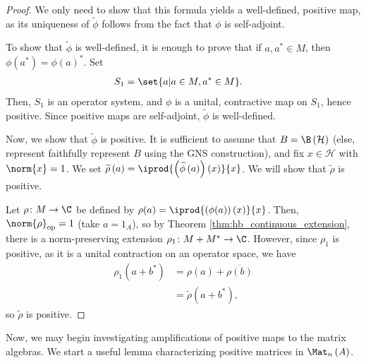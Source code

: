 \begin{proof}
  We only need to show that this formula yields a well-defined, positive map, as its uniqueness of $\widetilde{\phi}$ follows from the fact that $\phi$ is self-adjoint.\newline

  To show that $\widetilde{\phi}$ is well-defined, it is enough to prove that if $a,a^{\ast}\in M$, then $\phi\left( a^{\ast} \right) = \phi\left( a \right)^{\ast}$. Set
  \begin{align*}
    S_1 &= \set{a | a\in M,a^{\ast}\in M}.
  \end{align*}
  Then, $S_1$ is an operator system, and $\phi$ is a unital, contractive map on $S_1$, hence positive. Since positive maps are self-adjoint, $\widetilde{\phi}$ is well-defined.\newline

  Now, we show that $\widetilde{\phi}$ is positive. It is sufficient to assume that $B = \B\left( \mathcal{H} \right)$ (else, represent faithfully represent $B$ using the GNS construction), and fix $x\in \mathcal{H}$ with $\norm{x} = 1$. We set $\widetilde{\rho}\left( a \right) = \iprod{\left( \widetilde{\phi}\left( a \right) \right)(x)}{x}$. We will show that $\widetilde{\rho}$ is positive.\newline

  Let $\rho\colon M\rightarrow \C$ be defined by $\rho(a) = \iprod{\left( \phi(a) \right)(x)}{x}$. Then, $\norm{\rho}_{\op} = 1$ (take $a = 1_A$), so by Theorem \ref{thm:hb_continuous_extension}, there is a norm-preserving extension $\rho_1\colon M + M^{\ast}\rightarrow \C$. However, since $\rho_1$ is positive, as it is a unital contraction on an operator space, we have
  \begin{align*}
    \rho_1\left( a + b^{\ast} \right) &= \rho\left( a \right) + \overline{\rho\left( b \right)}\\
                                      &= \widetilde{\rho}\left( a + b^{\ast} \right),
  \end{align*}
  so $\widetilde{\rho}$ is positive.
\end{proof}
Now, we may begin investigating amplifications of positive maps to the matrix algebras. We start a useful lemma characterizing positive matrices in $\Mat_n\left( A \right)$.
